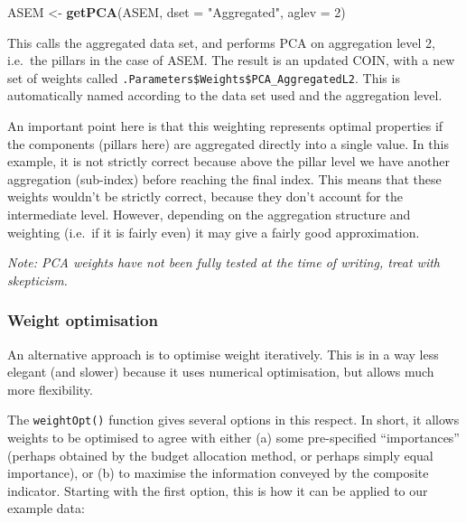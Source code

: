 \documentclass[
]{book}
\newenvironment{Shaded}{\begin{snugshade}}{\end{snugshade}}
\newcommand{\DataTypeTok}[1]{\textcolor[rgb]{0.13,0.29,0.53}{#1}}
\newcommand{\DecValTok}[1]{\textcolor[rgb]{0.00,0.00,0.81}{#1}}
\newcommand{\KeywordTok}[1]{\textcolor[rgb]{0.13,0.29,0.53}{\textbf{#1}}}
\newcommand{\NormalTok}[1]{#1}
\newcommand{\StringTok}[1]{\textcolor[rgb]{0.31,0.60,0.02}{#1}}
\begin{document}
\begin{Shaded}
\begin{Highlighting}[]
\NormalTok{ASEM <-}\StringTok{ }\KeywordTok{getPCA}\NormalTok{(ASEM, }\DataTypeTok{dset =} \StringTok{"Aggregated"}\NormalTok{, }\DataTypeTok{aglev =} \DecValTok{2}\NormalTok{)}
\end{Highlighting}
\end{Shaded}

This calls the aggregated data set, and performs PCA on aggregation level 2, i.e.~the pillars in the case of ASEM. The result is an updated COIN, with a new set of weights called \texttt{.Parameters\$Weights\$PCA\_AggregatedL2}. This is automatically named according to the data set used and the aggregation level.

An important point here is that this weighting represents optimal properties if the components (pillars here) are aggregated directly into a single value. In this example, it is not strictly correct because above the pillar level we have another aggregation (sub-index) before reaching the final index. This means that these weights wouldn't be strictly correct, because they don't account for the intermediate level. However, depending on the aggregation structure and weighting (i.e.~if it is fairly even) it may give a fairly good approximation.

\emph{Note: PCA weights have not been fully tested at the time of writing, treat with skepticism.}

\hypertarget{weight-optimisation-1}{%
\subsubsection{Weight optimisation}\label{weight-optimisation-1}}

An alternative approach is to optimise weight iteratively. This is in a way less elegant (and slower) because it uses numerical optimisation, but allows much more flexibility.

The \texttt{weightOpt()} function gives several options in this respect. In short, it allows weights to be optimised to agree with either (a) some pre-specified ``importances'' (perhaps obtained by the budget allocation method, or perhaps simply equal importance), or (b) to maximise the information conveyed by the composite indicator. Starting with the first option, this is how it can be applied to our example data:
\end{document}

